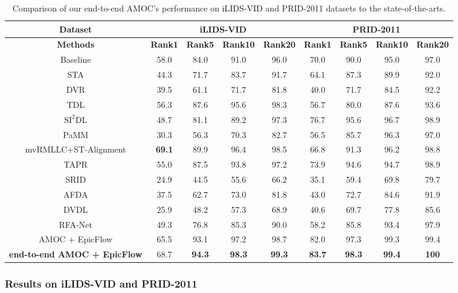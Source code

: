 \documentclass[journal]{IEEEtran}
\begin{document}
 \begin{table*}
 	\linespread{1.5}\selectfont
 	\centering
 	\caption{Comparison of our end-to-end AMOC's performance on iLIDS-VID and PRID-2011 datasets to the state-of-the-arts.  }
 	\begin{tabular}{c|cccc|cccc}
 		\hline
 		\textbf{Dataset} &\multicolumn{4}{c|}{\textbf{iLIDS-VID}}&\multicolumn{4}{c}{\textbf{PRID-2011}}\\
 		\hline
 		\textbf{Methods} & \textbf{Rank1} & \textbf{Rank5} & \textbf{Rank10} & \textbf{Rank20} & \textbf{Rank1} & \textbf{Rank5} & \textbf{Rank10} & \textbf{Rank20}\\
 		\hline
 		Baseline \cite{mclaughlinrecurrent} & 58.0 & 84.0 & 91.0 & 96.0 & 70.0 & 90.0 & 95.0 & 97.0\\
 		STA\cite{liu2015spatio} & 44.3 & 71.7 & 83.7 & 91.7 &64.1 & 87.3&89.9 &92.0\\
 		DVR\cite{wang2016person} &39.5&61.1&71.7&81.8&40.0&71.7&84.5&92.2\\
 		TDL\cite{you2016top} &56.3&87.6&95.6&98.3&56.7&80.0&87.6&93.6\\
 		$\mathrm{SI^{2}DL}$\cite{zhu2016video}&48.7&81.1&89.2&97.3&76.7&95.6&96.7&98.9\\
 		PaMM\cite{cho2016improving} &30.3&56.3&70.3&82.7&56.5&85.7&96.3&97.0\\
 		mvRMLLC+ST-Alignment\cite{chen2015person}&\textbf{69.1}&89.9&96.4&98.5&66.8&91.3&96.2&98.8\\
 		TAPR\cite{gao2016temporally}&55.0&87.5&93.8&97.2&73.9&94.6&94.7&98.9\\
 		SRID\cite{karanam2015sparse}&24.9&44.5&55.6&66.2&35.1&59.4&69.8&79.7\\
 		AFDA\cite{Li2015Multi}   &37.5&62.7&73.0&81.8&43.0&72.7&84.6&91.9\\
 		DVDL\cite{Karanam2015Person} &25.9&48.2&57.3&68.9&40.6&69.7&77.8&85.6\\
 		RFA-Net\cite{yan2016person}&49.3&76.8&85.3&90.0&58.2&85.8&93.4&97.9\\
 		\hline
 		AMOC + EpicFlow & 65.5& 93.1& 97.2 & 98.7 &82.0 &97.3 &99.3 &99.4\\
 		\textbf{end-to-end AMOC + EpicFlow} & 68.7& \textbf{94.3} & \textbf{98.3} & \textbf{99.3} & \textbf{83.7} & \textbf{98.3} & \textbf{99.4} & \textbf{100} \\
 		\hline
 	\end{tabular}%
 	\label{tab:comp}%
 \end{table*}%
 
 \subsubsection{Results on iLIDS-VID and PRID-2011}\label{res_ilids}
 
\end{document}
